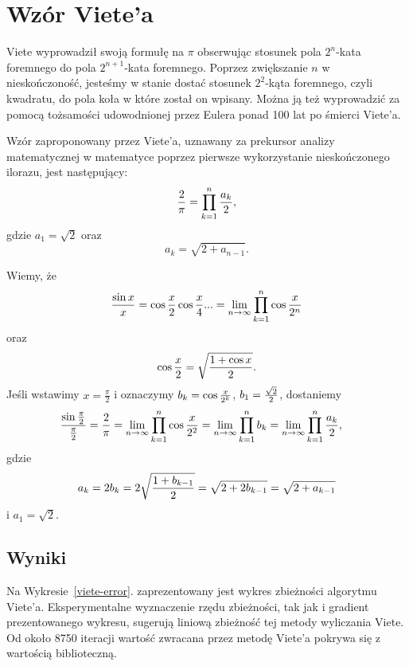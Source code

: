\section{Wzór Viete'a}


Viete wyprowadził swoją formułę na $\pi$ obserwując stosunek pola $2^n$-kata foremnego do pola $2^{n+1}$-kata foremnego. Poprzez zwiększanie $n$ w nieskończoność, jesteśmy w stanie dostać stosunek $2^2$-kąta foremnego, czyli kwadratu, do pola koła w które został on wpisany. Można ją też wyprowadzić za pomocą tożsamości udowodnionej przez Eulera ponad 100 lat po śmierci Viete'a.

Wzór zaproponowany przez Viete'a, uznawany za prekursor analizy matematycznej w matematyce poprzez pierwsze wykorzystanie nieskończonego ilorazu, jest następujący:
\begin{equation}
    {2\over\pi}=\prod\limits_{k=1}^n{a_k\over2},
\end{equation}
gdzie $a_1=\sqrt2$ oraz
$$a_k=\sqrt{2+a_{n-1}}.$$

Wiemy, że
$${\sin x\over x}=\cos\frac x2\cos\frac x4...=\lim_{n\to\infty}\prod\limits_{k=1}^n\cos{x\over 2^n}$$
oraz
$$\cos\frac x2=\sqrt{{1+\cos x\over 2}}.$$
Jeśli wstawimy $x=\frac\pi2$ i oznaczymy $b_k=\cos{x\over 2^k}$, $b_1={\sqrt2\over2}$,  dostaniemy
\begin{align*}
    {\sin\frac\pi2\over\frac\pi2}&=\frac2\pi=\lim_{n\to\infty}\prod\limits_{k=1}^n\cos{x\over 2^2}=\lim_{n\to\infty}\prod\limits_{k=1}^nb_k=\lim_{n\to\infty}\prod\limits_{k=1}^n{a_k\over 2},
\end{align*}
gdzie 
$$a_k=2b_k=2\sqrt{{1+b_{k-1}\over 2}}=\sqrt{2+2b_{k-1}}=\sqrt{2+a_{k-1}}$$
i $a_1=\sqrt2$.

\subsection{Wyniki}

Na Wykresie~\ref{viete-error}. zaprezentowany jest wykres zbieżności algorytmu Viete'a. Eksperymentalne wyznaczenie rzędu zbieżności, tak jak i gradient prezentowanego wykresu, sugerują liniową zbieżność tej metody wyliczania Viete. Od około 8750 iteracji wartość zwracana przez metodę Viete'a pokrywa się z wartością biblioteczną.

